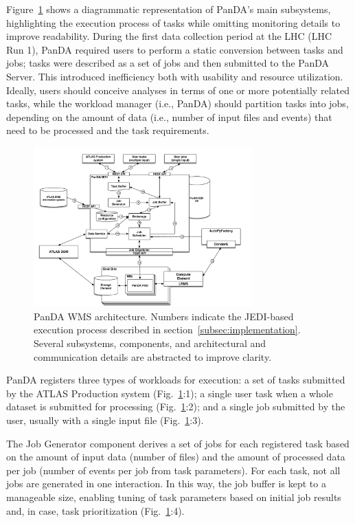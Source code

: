Figure~\ref{fig:architecture} shows a diagrammatic representation of PanDA's
main subsystems, highlighting the execution process of tasks while omitting
monitoring details to improve readability. During the first data collection
period at the LHC (LHC Run 1), PanDA required users to perform a static
conversion between tasks and jobs; tasks were described as a set of jobs and
then submitted to the PanDA Server. This introduced inefficiency both with
usability and resource utilization. Ideally, users should conceive analyses in
terms of one or more potentially related tasks, while the workload manager
(i.e., PanDA) should partition tasks into jobs, depending on the amount of data
(i.e., number of input files and events) that need to be processed and the task
requirements.

\begin{figure}
  \includegraphics[width=0.75\textwidth]{images/PanDA_WMS.pdf}
  \caption{PanDA WMS architecture. Numbers indicate the JEDI-based execution
           process described in section~\ref{subsec:implementation}. Several
           subsystems, components, and architectural and communication details
           are abstracted to improve clarity.}
  \label{fig:architecture}
\end{figure}

PanDA registers three types of workloads for execution: a set of tasks
submitted by the ATLAS Production system (Fig.~\ref{fig:architecture}:1); a
single user task when a whole dataset is submitted for processing
(Fig.~\ref{fig:architecture}:2); and a single job submitted by the user,
usually with a single input file (Fig.~\ref{fig:architecture}:3).

The Job Generator component derives a set of jobs for each registered task
based on the amount of input data (number of files) and the amount of processed
data per job (number of events per job from task parameters). For each task,
not all jobs are generated in one interaction. In this way, the job buffer is
kept to a manageable size, enabling tuning of task parameters based on initial
job results and, in case, task prioritization (Fig.~\ref{fig:architecture}:4).


